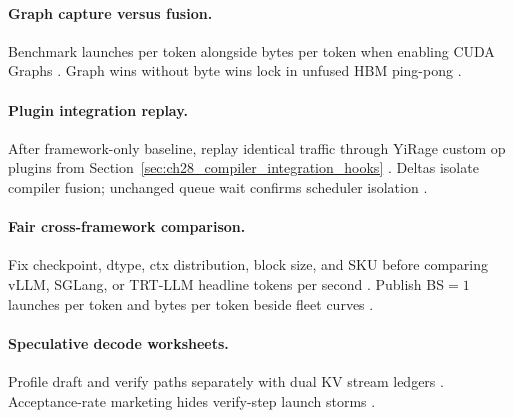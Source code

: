 \paragraph{Graph capture versus fusion.} Benchmark launches per token alongside bytes per token when enabling CUDA Graphs \citep{nvidia2024cudagraphs,memoryfloor2026,taxbreak2026,patel2025llminference,yirage2026,chen2020compilerbasedhardw,kwon2023vllm,liu2024deepseekv3,dao2022flashattention,amd2024aie,amd2024xdna,dlbook,dao2023flashdecoding,nvidia2022hopper,semianalysis2024tma}. Graph wins without byte wins lock in unfused HBM ping-pong \citep{memoryfloor2026,nvidia2024cudagraphs,patel2025llminference,yirage2026,chen2020compilerbasedhardw,taxbreak2026,kwon2023vllm,dlbook}.

\paragraph{Plugin integration replay.} After framework-only baseline, replay identical traffic through YiRage custom op plugins from Section~\ref{sec:ch28_compiler_integration_hooks} \citep{yirage2026,chen2020compilerbasedhardw,kwon2023vllm,patel2025llminference,taxbreak2026,memoryfloor2026,liu2024deepseekv3,nvidia2024cudagraphs,dao2022flashattention,amd2024aie,amd2024xdna,dlbook,dao2023flashdecoding,nvidia2022hopper,semianalysis2024tma}. Deltas isolate compiler fusion; unchanged queue wait confirms scheduler isolation \citep{patel2025llminference,kwon2023vllm,yirage2026,chen2020compilerbasedhardw,memoryfloor2026,taxbreak2026,dlbook}.

\paragraph{Fair cross-framework comparison.} Fix checkpoint, dtype, ctx distribution, block size, and SKU before comparing vLLM, SGLang, or TRT-LLM headline tokens per second \citep{kwon2023vllm,patel2025llminference,taxbreak2026,memoryfloor2026,yirage2026,chen2020compilerbasedhardw,liu2024deepseekv3,nvidia2024cudagraphs,dao2022flashattention,amd2024aie,amd2024xdna,dlbook,dao2023flashdecoding,nvidia2022hopper,semianalysis2024tma}. Publish BS${=}1$ launches per token and bytes per token beside fleet curves \citep{taxbreak2026,memoryfloor2026,patel2025llminference,yirage2026,chen2020compilerbasedhardw,kwon2023vllm,dlbook}.

\paragraph{Speculative decode worksheets.} Profile draft and verify paths separately with dual KV stream ledgers \citep{patel2025llminference,kwon2023vllm,liu2024deepseekv3,yirage2026,chen2020compilerbasedhardw,memoryfloor2026,taxbreak2026,nvidia2024cudagraphs,dao2022flashattention,amd2024aie,amd2024xdna,dlbook,dao2023flashdecoding,nvidia2022hopper,semianalysis2024tma}. Acceptance-rate marketing hides verify-step launch storms \citep{patel2025llminference,taxbreak2026,memoryfloor2026,kwon2023vllm,yirage2026,chen2020compilerbasedhardw,dlbook}.

